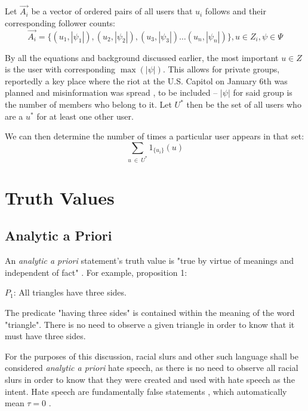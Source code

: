 \documentclass[preprint,review,12pt]{elsarticle}
\begin{document}
Let $\vec{A_i}$ be a vector of ordered pairs of all users that $u_i$ follows and their corresponding follower counts:
\begin{equation} 
\label{row of adjacency matrix}
\vec{A_i}=\{(u_1,|\psi_1|),(u_2,|\psi_2|),(u_3,|\psi_3|)\dots (u_n,|\psi_n|)\}, u \in Z_i, \psi \in \Psi
\end{equation}

By all the equations and background discussed earlier, the most important $u \in Z$ is the user with corresponding $\max(|\psi|)$. This allows for private groups, reportedly a key place where the riot at the U.S. Capitol on January 6th was planned and misinformation was spread \cite{yin2021facebook,horwitz2020facebook}, to be included -- $|\psi|$ for said group is the number of members who belong to it. 
Let $U^*$ then be the set of all users who are a $u^*$ for at least one other user.

We can then determine the number of times a particular user appears in that set: 
\begin{equation}
    \sum_{u\ \in \ U^*}1_{\{u_i\}}(u)
\end{equation}



\appendix

\section{Truth Values}
\label{truthvalue appendix}
\subsection{Analytic a Priori}
An \textit{analytic a priori} statement's truth value is "true by virtue of meanings and independent of fact" \cite{quine1951main}. 
For example, proposition 1: \begin{center}
    $P_1$: All triangles have three sides.
\end{center}
The predicate "having three sides" is contained within the meaning of the word "triangle". There is no need to observe a given triangle in order to know that it must have three sides.

For the purposes of this discussion, racial slurs and other such language shall be considered \textit{analytic a priori} hate speech, as there is no need to observe all racial slurs in order to know that they were created and used with hate speech as the intent. Hate speech are fundamentally false statements \cite{waldron2012harm}, which automatically mean $\tau = 0$ .
\end{document}
